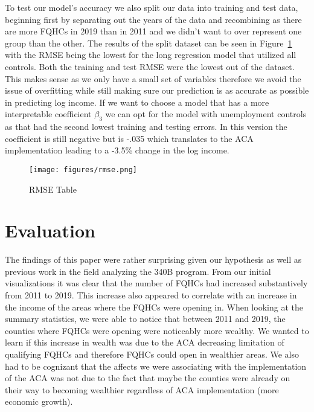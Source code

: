 \documentclass[12pt, ]{article}
\begin{document}
To test our model's accuracy we also split our data into training and
test data, beginning first by separating out the years of the data and
recombining as there are more FQHCs in 2019 than in 2011 and we didn't
want to over represent one group than the other. The results of the
split dataset can be seen in Figure~\ref{fig-7} with the RMSE being the
lowest for the long regression model that utilized all controls. Both
the training and test RMSE were the lowest out of the dataset. This
makes sense as we only have a small set of variables therefore we avoid
the issue of overfitting while still making sure our prediction is as
accurate as possible in predicting log income. If we want to choose a
model that has a more interpretable coefficient \(\beta_{3}\) we can opt
for the model with unemployment controls as that had the second lowest
training and testing errors. In this version the coefficient is still
negative but is -.035 which translates to the ACA implementation leading
to a -3.5\% change in the log income.

\begin{figure}[tbp]

{\centering \texttt{[image: figures/rmse.png]}

}

\caption{\label{fig-7}RMSE Table}

\end{figure}

\hypertarget{evaluation}{%
\section{Evaluation}\label{evaluation}}

The findings of this paper were rather surprising given our hypothesis
as well as previous work in the field analyzing the 340B program. From
our initial visualizations it was clear that the number of FQHCs had
increased substantively from 2011 to 2019. This increase also appeared
to correlate with an increase in the income of the areas where the FQHCs
were opening in. When looking at the summary statistics, we were able to
notice that between 2011 and 2019, the counties where FQHCs were opening
were noticeably more wealthy. We wanted to learn if this increase in
wealth was due to the ACA decreasing limitation of qualifying FQHCs and
therefore FQHCs could open in wealthier areas. We also had to be
cognizant that the affects we were associating with the implementation
of the ACA was not due to the fact that maybe the counties were already
on their way to becoming wealthier regardless of ACA implementation
(more economic growth).
\end{document}
